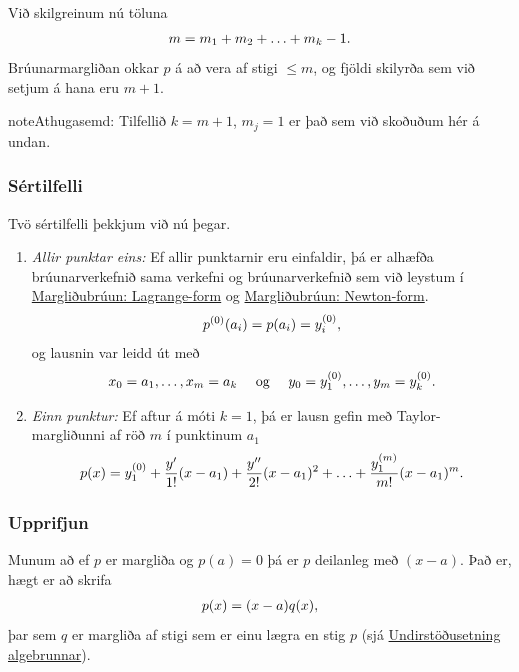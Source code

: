 \documentclass[a4paper,10pt,icelandic]{sphinxmanual}
\begin{document}
Við skilgreinum nú töluna
\begin{gather}
\begin{split}m = m_1 + m_2 + \ldots + m_k - 1.\end{split}\notag
\end{gather}
Brúunarmargliðan okkar \(p\) á að vera af stigi \(\leq m\), og
fjöldi skilyrða sem við setjum á hana eru \(m+1\).

\begin{notice}{note}{Athugasemd:}
Tilfellið \(k=m+1\), \(m_j=1\) er það sem við skoðuðum hér á undan.
\end{notice}


\subsubsection{Sértilfelli}
\label{kafli03:sertilfelli}
Tvö sértilfelli þekkjum við nú þegar.
\begin{enumerate}
\item {} 
\emph{Allir punktar eins:} Ef allir punktarnir eru einfaldir, þá er
alhæfða brúunarverkefnið sama verkefni og brúunarverkefnið sem við
leystum í {\hyperref[kafli03:margliubruun-lagrange-form]{Margliðubrúun: Lagrange-form}} og {\hyperref[kafli03:margliubruun-newton-form]{Margliðubrúun: Newton-form}}.
\begin{gather}
\begin{split}p^{(0)}(a_i) = p(a_i) = y_i^{(0)},\end{split}\notag
\end{gather}
og lausnin var leidd út með
\begin{gather}
\begin{split}x_0=a_1,\dots,x_m=a_k \quad \text{ og } \quad
y_0=y_1^{(0)},\dots,y_m=y_k^{(0)}.\end{split}\notag
\end{gather}
\item {} 
\emph{Einn punktur:} Ef aftur á móti \(k = 1\), þá er lausn gefin
með Taylor-margliðunni af röð \(m\) í punktinum \(a_1\)
\begin{gather}
\begin{split}p(x) = y_1^{(0)} + \frac{y'}{1!}(x - a_1) + \frac{y''}{2!}(x - a_1)^2 +
  \ldots + \frac{y_1^{(m)}}{m!}(x - a_1)^m.\end{split}\notag
\end{gather}
\end{enumerate}


\subsubsection{Upprifjun}
\label{kafli03:upprifjun}
Munum að ef \(p\) er margliða og \(p(a)=0\) þá er \(p\)
deilanleg með \((x-a)\). Það er, hægt er að skrifa
\begin{gather}
\begin{split}p(x) = (x-a)q(x),\end{split}\notag
\end{gather}
þar sem \(q\) er margliða af stigi sem er einu lægra en stig
\(p\) (sjá \href{http://m.xn--st-2ia.is/fletta/undirst\%C3\%B6\%C3\%B0usetning/algebrunnar?device=desktop}{Undirstöðusetning algebrunnar}).
\end{document}
